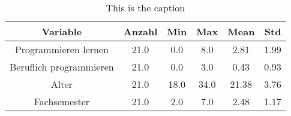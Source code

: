 \begin{table}
\centering
\caption{This is the caption}
\label{tab:table_label}
\begin{tabular}{cccccc}
\toprule
               Variable &  Anzahl &  Min &  Max &  Mean &  Std \\
\midrule
   Programmieren lernen &    21.0 &  0.0 &  8.0 &  2.81 & 1.99 \\
Beruflich programmieren &    21.0 &  0.0 &  3.0 &  0.43 & 0.93 \\
                  Alter &    21.0 & 18.0 & 34.0 & 21.38 & 3.76 \\
           Fachsemester &    21.0 &  2.0 &  7.0 &  2.48 & 1.17 \\
\bottomrule
\end{tabular}
\end{table}
